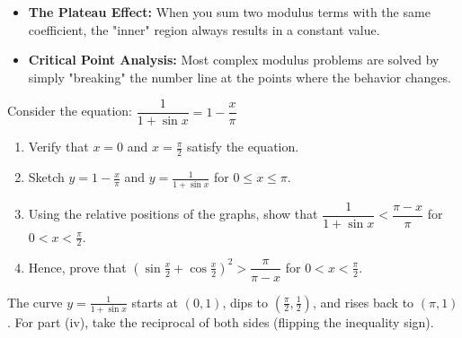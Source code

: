 \begin{takeaways}
\begin{itemize}[leftmargin=*]
\item \textbf{The Plateau Effect:} When you sum two modulus terms with the same coefficient, the "inner" region always results in a constant value.
\item \textbf{Critical Point Analysis:} Most complex modulus problems are solved by simply "breaking" the number line at the points where the behavior changes.
\end{itemize}
\end{takeaways}

\begin{problem}
Consider the equation: $\dfrac{1}{1 + \sin x} = 1 - \dfrac{x}{\pi}$
\begin{enumerate}[label=(\roman*)]
\item Verify that $x = 0$ and $x = \frac{\pi}{2}$ satisfy the equation.
\item Sketch $y = 1 - \frac{x}{\pi}$ and $y = \frac{1}{1 + \sin x}$ for $0 \le x \le \pi$.
\item Using the relative positions of the graphs, show that $\dfrac{1}{1 + \sin x} < \dfrac{\pi - x}{\pi}$ for $0 < x < \frac{\pi}{2}$.
\item Hence, prove that $\left(\sin \frac{x}{2} + \cos \frac{x}{2}\right)^2 > \dfrac{\pi}{\pi - x}$ for $0 < x < \frac{\pi}{2}$.
\end{enumerate}
\end{problem}

\begin{hint}
The curve $y = \frac{1}{1+\sin x}$ starts at $(0, 1)$, dips to $( \frac{\pi}{2}, \frac{1}{2})$, and rises back to $(\pi, 1)$. For part (iv), take the reciprocal of both sides (flipping the inequality sign).
\end{hint}

